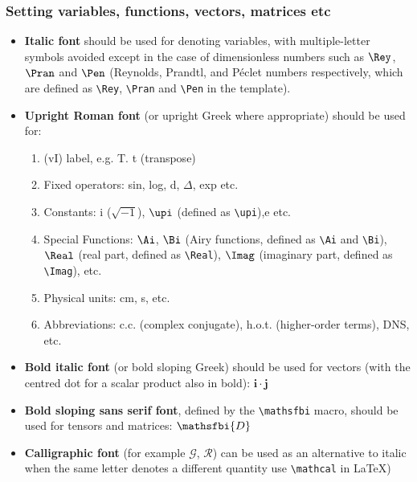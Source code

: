 \documentclass[lineno]{jfm}
\begin{document}
\subsubsection{Setting variables, functions, vectors, matrices etc}
\begin{itemize} \label{sec:MathNot}
\item {\bf Italic font} should be used for denoting variables, with multiple-letter symbols avoided except in the case of dimensionless numbers such as $\Rey$, $\Pran$ and $\Pen$ (Reynolds, Prandtl, and P\'eclet numbers respectively, which are defined as \verb}\Rey}, \verb}\Pran} and \verb}\Pen} in the template).\\
\item {\bf Upright Roman font} (or upright Greek where appropriate) should be used for:\\
\begin {enumerate}
\item (vI) label, e.g.  T. t (transpose)\\
\item Fixed operators: sin, log, d, $\Delta$, exp etc.\\
\item Constants: i ($\sqrt{-1}$), $\upi$ (defined as \verb}\upi}),e  etc.\\
\item Special Functions: $\Ai$, $\Bi$ (Airy functions, defined as \verb}\Ai} and \verb}\Bi}), $\Real$ (real part, defined as \verb}\Real}), $\Imag$ (imaginary part, defined as \verb}\Imag}), etc.\\[-4pt]
\item Physical units: cm, s, etc.\\[-4pt]
\item Abbreviations: c.c. (complex conjugate), h.o.t. (higher-order terms), DNS, etc.\\[-4pt]
\end {enumerate}
\item {\bf Bold italic font} (or bold sloping Greek) should be used for vectors (with the centred dot for a scalar product also in bold): $\boldsymbol{i \cdot j}$\\[-4pt]
\item {\bf Bold sloping sans serif font}, defined by the \verb}\mathsfbi} macro, should be used for tensors and matrices: $\mathsfbi{D}$ \\[-4pt]
\item {\bf Calligraphic font} (for example $\mathcal{G}$, $\mathcal{R}$) can be used as an alternative to italic when the same letter denotes a different quantity use \verb}\mathcal} in \LaTeX)
\end{itemize}
\end{document}
